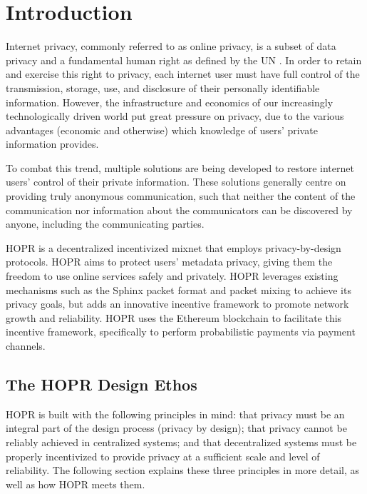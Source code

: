 
\section{Introduction}
\label{sec:introduction}

Internet privacy, commonly referred to as online privacy, is a subset of data privacy and a fundamental human right as defined by the UN \cite{un2018}.
In order to retain and exercise this right to privacy, each internet user must have full control of the transmission, storage, use, and disclosure of their
personally identifiable information. However, the infrastructure and economics of our increasingly technologically driven world put great pressure on privacy, due to the various advantages (economic and otherwise) which knowledge of users' private information provides. 

To combat this trend, multiple solutions are being developed to restore internet users' control of their private information. These solutions generally centre on providing truly anonymous communication, such that neither the content of the communication nor information about the communicators can be discovered by anyone, including the communicating parties.

HOPR is a decentralized incentivized mixnet that employs privacy-by-design protocols. HOPR aims to protect users' metadata privacy, giving them the
freedom to use online services safely and privately. HOPR leverages existing mechanisms such as the Sphinx packet format
\cite{sphinxpaper} and packet mixing to achieve its privacy goals, but adds an innovative incentive framework to promote network growth and reliability. HOPR uses the
Ethereum blockchain \cite{ethereum} to facilitate this incentive framework, specifically to perform probabilistic payments via payment channels. 


\subsection{The HOPR Design Ethos}
\label{sec:vision}

HOPR is built with the following principles in mind: that privacy must be an integral part of the design process (privacy by design); that privacy cannot be reliably achieved in centralized systems; and that decentralized systems must be properly incentivized to provide privacy at a sufficient scale and level of reliability. The following section explains these three principles in more detail, as well as how HOPR meets them.

